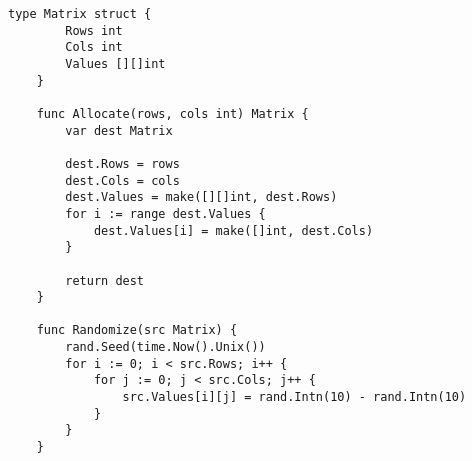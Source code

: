 \begin{lstlisting}[label=lst:mtx-util,caption=Пакет\, реализующий функции для работы с матрицами]
	type Matrix struct {
		Rows int
		Cols int
		Values [][]int
	}
	
	func Allocate(rows, cols int) Matrix {
		var dest Matrix
		
		dest.Rows = rows
		dest.Cols = cols
		dest.Values = make([][]int, dest.Rows)
		for i := range dest.Values {
			dest.Values[i] = make([]int, dest.Cols)
		}
		
		return dest
	}
	
	func Randomize(src Matrix) {
		rand.Seed(time.Now().Unix())
		for i := 0; i < src.Rows; i++ {
			for j := 0; j < src.Cols; j++ {
				src.Values[i][j] = rand.Intn(10) - rand.Intn(10)
			}
		}
	}
\end{lstlisting}

\captionsetup{singlelinecheck = false, justification=raggedleft}
